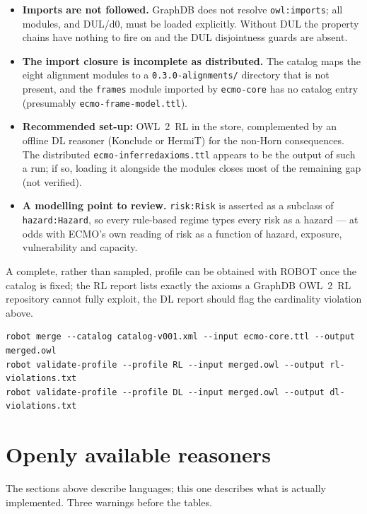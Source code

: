 \documentclass[11pt,a4paper]{article}
\begin{document}
\begin{itemize}
  \item \textbf{Imports are not followed.} GraphDB does not resolve
    \texttt{owl:imports}; all modules, and DUL/d0, must be loaded explicitly.
    Without DUL the property chains have nothing to fire on and the DUL
    disjointness guards are absent.
  \item \textbf{The import closure is incomplete as distributed.} The catalog
    maps the eight alignment modules to a \texttt{0.3.0-alignments/}
    directory that is not present, and the \texttt{frames} module imported by
    \texttt{ecmo-core} has no catalog entry (presumably
    \texttt{ecmo-frame-model.ttl}).
  \item \textbf{Recommended set-up:} OWL~2~RL in the store, complemented by an
    offline DL reasoner (Konclude or HermiT) for the non-Horn consequences.
    The distributed \texttt{ecmo-inferredaxioms.ttl} appears to be the output
    of such a run; if so, loading it alongside the modules closes most of the
    remaining gap (not verified).
  \item \textbf{A modelling point to review.} \texttt{risk:Risk} is asserted
    as a subclass of \texttt{hazard:Hazard}, so every rule-based regime types
    every risk as a hazard --- at odds with ECMO's own reading of risk as a
    function of hazard, exposure, vulnerability and capacity.
\end{itemize}

\noindent
A complete, rather than sampled, profile can be obtained with ROBOT once the
catalog is fixed; the RL report lists exactly the axioms a GraphDB OWL~2~RL
repository cannot fully exploit, the DL report should flag the cardinality
violation above.
\begin{lstlisting}[language={}]
robot merge --catalog catalog-v001.xml --input ecmo-core.ttl --output merged.owl
robot validate-profile --profile RL --input merged.owl --output rl-violations.txt
robot validate-profile --profile DL --input merged.owl --output dl-violations.txt
\end{lstlisting}

\section{Openly available reasoners}
\label{sec:reasoners}

The sections above describe languages; this one describes what is actually
implemented. Three warnings before the tables.
\end{document}
